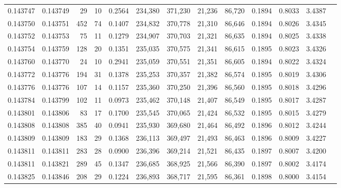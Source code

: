 \begin{tabular}{rrrrrrrrrrrrr}
0.143747 & 0.143749 &    29 &  10 &                                     0.2564 & 234,380 & 371,230 &  21,236 &  86,720 & 0.1894 & 0.8033 & 3.4387 \\
0.143750 & 0.143751 &   452 &  74 &                                     0.1407 & 234,832 & 370,778 &  21,310 &  86,646 & 0.1894 & 0.8026 & 3.4345 \\
0.143752 & 0.143753 &    75 &  11 &                                     0.1279 & 234,907 & 370,703 &  21,321 &  86,635 & 0.1894 & 0.8025 & 3.4338 \\
0.143754 & 0.143759 &   128 &  20 &                                     0.1351 & 235,035 & 370,575 &  21,341 &  86,615 & 0.1895 & 0.8023 & 3.4326 \\
0.143760 & 0.143770 &    24 &  10 &                                     0.2941 & 235,059 & 370,551 &  21,351 &  86,605 & 0.1894 & 0.8022 & 3.4324 \\
0.143772 & 0.143776 &   194 &  31 &                                     0.1378 & 235,253 & 370,357 &  21,382 &  86,574 & 0.1895 & 0.8019 & 3.4306 \\
0.143776 & 0.143776 &   107 &  14 &                                     0.1157 & 235,360 & 370,250 &  21,396 &  86,560 & 0.1895 & 0.8018 & 3.4296 \\
0.143784 & 0.143799 &   102 &  11 &                                     0.0973 & 235,462 & 370,148 &  21,407 &  86,549 & 0.1895 & 0.8017 & 3.4287 \\
0.143801 & 0.143806 &    83 &  17 &                                     0.1700 & 235,545 & 370,065 &  21,424 &  86,532 & 0.1895 & 0.8015 & 3.4279 \\
0.143808 & 0.143808 &   385 &  40 &                                     0.0941 & 235,930 & 369,680 &  21,464 &  86,492 & 0.1896 & 0.8012 & 3.4244 \\
0.143809 & 0.143809 &   183 &  29 &                                     0.1368 & 236,113 & 369,497 &  21,493 &  86,463 & 0.1896 & 0.8009 & 3.4227 \\
0.143811 & 0.143811 &   283 &  28 &                                     0.0900 & 236,396 & 369,214 &  21,521 &  86,435 & 0.1897 & 0.8007 & 3.4200 \\
0.143811 & 0.143821 &   289 &  45 &                                     0.1347 & 236,685 & 368,925 &  21,566 &  86,390 & 0.1897 & 0.8002 & 3.4174 \\
0.143825 & 0.143846 &   208 &  29 &                                     0.1224 & 236,893 & 368,717 &  21,595 &  86,361 & 0.1898 & 0.8000 & 3.4154 \\

\end{tabular}
